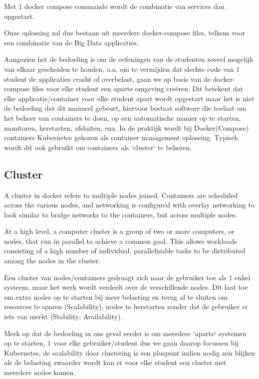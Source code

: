 Met 1 docker compose commando wordt de combinatie van services dan opgestart.

Onze oplossing zal dus bestaan uit meerdere docker-compose files, telkens voor een combinatie van de Big Data applicaties.

Aangezien het de bedoeling is om de oefeningen van de studenten zoveel mogelijk van elkaar gescheiden te houden, o.a. om te vermijden dat slechte code van 1 student de applicaties crasht of overbelast, gaan we op basis van de docker-compose files voor elke student een aparte omgeving creëren. Dit betekent dat elke applicatie/container voor elke student apart wordt opgestart maar het is niet de bedoeling dat dit manueel gebeurt, hiervoor bestaat software die toelaat om het beheer van containers te doen, op een automatische manier op te starten, monitoren, herstarten, afsluiten, enz.
In de praktijk wordt bij Docker(Compose) containers Kubernetes gekozen als container management oplossing. Typisch wordt dit ook gebruikt om containers als `cluster` te beheren.

\subsection{Cluster}
A cluster in docker refers to multiple nodes joined. Containers are scheduled across the various nodes, and networking is configured with overlay networking to look similar to bridge networks to the containers, but across multiple nodes.\autocite{BMitch2019}

At a high level, a computer cluster is a group of two or more computers, or nodes, that run in parallel to achieve a common goal. This allows workloads consisting of a high number of individual, parallelizable tasks to be distributed among the nodes in the cluster.\autocite{Nordhoff2020}

Een cluster van nodes/containers gedraagt zich naar de gebruiker toe als 1 enkel systeem, maar het werk wordt verdeelt over de verschillende nodes. Dit laat toe om extra nodes op te starten bij meer belasting en terug af te sluiten om resources te sparen (Scalability), nodes te herstarten zonder dat de gebruiker er iets van merkt (Stability; Availability).

Merk op dat de bedoeling in ons geval eerder is om meerdere `aparte` systemen op te starten, 1 voor elke gebruiker/student dus we gaan daarop focussen bij Kubernetes, de scalability door clustering is een pluspunt indien nodig zou blijken als de belasting zwaarder wordt kan er voor elke student een cluster met meerdere nodes komen.

